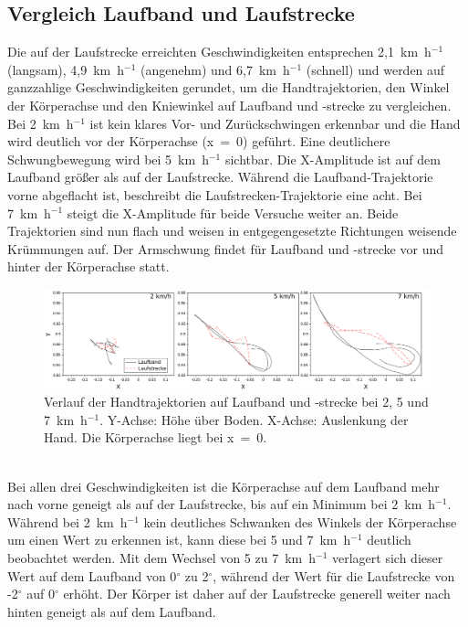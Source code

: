 \subsection{Vergleich Laufband und Laufstrecke}
Die auf der Laufstrecke erreichten Geschwindigkeiten entsprechen 2,1~km~h$^{-1}$ (langsam), 4,9~km~h$^{-1}$ (angenehm) und 6,7~km~h$^{-1}$ (schnell) und werden auf ganzzahlige Geschwindigkeiten gerundet, um die Handtrajektorien, den Winkel der Körperachse und den Kniewinkel auf Laufband und -strecke zu vergleichen.\\
Bei 2~km~h$^{-1}$ ist kein klares Vor- und Zurückschwingen erkennbar und die Hand wird deutlich vor der Körperachse (x~=~0) geführt. Eine deutlichere Schwungbewegung wird bei 5~km~h$^{-1}$ sichtbar. Die X-Amplitude ist auf dem Laufband größer als auf der Laufstrecke. Während die Laufband-Trajektorie vorne abgeflacht ist, beschreibt die Laufstrecken-Trajektorie eine acht. Bei 7~km~h$^{-1}$ steigt die X-Amplitude für beide Versuche weiter an. Beide Trajektorien sind nun flach und weisen in entgegengesetzte Richtungen weisende Krümmungen auf. Der Armschwung findet für Laufband und -strecke vor und hinter der Körperachse statt.
\begin{figure}[h!]
	\centering
	\includegraphics[width=\linewidth]{bilder/Ergebnisse/compare_hand}
	\caption[Handtrajektorien auf dem Laufband und -strecke]{Verlauf der Handtrajektorien auf Laufband und -strecke bei 2, 5 und 7~km~h$^{-1}$. Y-Achse: Höhe über Boden. X-Achse: Auslenkung der Hand. Die Körperachse liegt bei x~=~0.}
	\label{fig:res_compare_hand}
\end{figure}\\
Bei allen drei Geschwindigkeiten ist die Körperachse auf dem Laufband mehr nach vorne geneigt als auf der Laufstrecke, bis auf ein Minimum bei 2~km~h$^{-1}$. Während bei 2~km~h$^{-1}$ kein deutliches Schwanken des Winkels der Körperachse um einen Wert zu erkennen ist, kann diese bei 5 und 7~km~h$^{-1}$ deutlich beobachtet werden. Mit dem Wechsel von 5 zu 7~km~h$^{-1}$ verlagert sich dieser Wert auf dem Laufband von 0$^{\circ}$ zu 2$^{\circ}$, während der Wert für die Laufstrecke von -2$^{\circ}$ auf 0$^{\circ}$ erhöht. Der Körper ist daher auf der Laufstrecke generell weiter nach hinten geneigt als auf dem Laufband.
